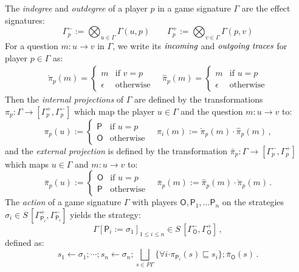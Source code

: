 \documentclass[format=sigplan,authordraft]{acmart}
\newcommand{\kw}[1]{\ensuremath{ \mathsf{#1} }}
\newcommand{\bdot}{\boldsymbol{\cdot}}
\begin{document}
\begin{definition}[Operators]
The \emph{indegree} and \emph{outdegree}
of a player $p$ in a game signature $\Gamma$
are the effect signatures:
\[
  \Gamma_p^- := \bigotimes_{u \in \Gamma} \Gamma(u, p)
  \qquad
  \Gamma_p^+ := \bigotimes_{v \in \Gamma} \Gamma(p, v)
\]
For a question $m : u \rightarrow v$ in $\Gamma$,
we write its $\emph{incoming}$ and $\emph{outgoing traces}$
for player $p \in \Gamma$ as:
\begin{gather*}
  \check{\pi}_p(m) = \begin{cases}
    m & \text{if } v = p \\
    \epsilon & \text{otherwise}
  \end{cases}
  \quad
  \hat{\pi}_p(m) = \begin{cases}
    m & \text{if } u = p \\
    \epsilon & \text{otherwise}
  \end{cases}
\end{gather*}
Then the \emph{internal projections} of $\Gamma$
are defined by the transformations
$\pi_p : \Gamma \rightarrow [ \Gamma_p^+, \Gamma_p^- ]$
which map the player $u \in \Gamma$
and the question $m : u \rightarrow v$ to:
\[
  \pi_p(u) := \begin{cases}
    \kw{P} & \text{if } u = p \\
    \kw{O} & \text{otherwise}
  \end{cases}
  \quad
  \pi_i(m) :=
    \check{\pi}_p(m) \cdot \hat{\pi}_p(m) \,,
\]
and the \emph{external projection}
is defined by the transformation
$\bar{\pi}_p : \Gamma \rightarrow [ \Gamma_p^-, \Gamma_p^+ ]$
which maps $u \in \Gamma$
and $m : u \rightarrow v$ to:
\[
  \bar{\pi}_p(u) := \begin{cases}
    \kw{O} & \text{if } u = p \\
    \kw{P} & \text{otherwise}
  \end{cases}
  \quad
  \bar{\pi}_p(m) :=
    \hat{\pi}_p(m) \cdot \check{\pi}_p(m) \,.
\]
The \emph{action} of a game signature $\Gamma$
with players $\kw{O}, \kw{P}_1, \ldots \kw{P}_n$
on the strategies
$\sigma_i \in S \, [\Gamma_{\kw{P}_i}^+, \Gamma_{\kw{P}_i}^-]$
yields the strategy:
\[
  \Gamma[\kw{P}_i := \sigma_1]_{1 \le i \le n} \in
    S \, [\Gamma_\kw{O}^-, \Gamma_\kw{O}^+] \,,
\]
defined as:
\[
  s_1 \leftarrow \sigma_1 ; \cdots ; s_n \leftarrow \sigma_n ; 
    \bigsqcup_{s \in P \Gamma}
    \{ \forall i \bdot \pi_{\kw{P}_i}(s) \sqsubseteq s_i \} ;
    \bar{\pi}_\kw{O}(s) \,.
\]
\end{definition}
\end{document}
